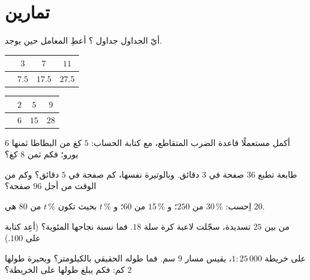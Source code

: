 \section{تمارين}

\begin{exercise}[$\star$]\label{exo:g7:prop:1}
أيّ الجداول جداول ؟ أعطِ المعامل حين
يوجد.
\begin{center}
\renewcommand{\arraystretch}{1.2}
\begin{tabular}{l|ccc}
 & $3$ & $7$ & $11$ \\
\hline
 & $7.5$ & $17.5$ & $27.5$ \\
\end{tabular}
\qquad
\begin{tabular}{l|ccc}
 & $2$ & $5$ & $9$ \\
\hline
 & $6$ & $15$ & $28$ \\
\end{tabular}
\end{center}
\end{exercise}

\begin{exercise}[$\star$]\label{exo:g7:prop:2}
أكمل مستعملًا قاعدة الضرب المتقاطع، مع كتابة الحساب:
$5$ كغ من البطاطا ثمنها $6$ يورو؛ فكم ثمن $8$ كغ؟
\end{exercise}

\begin{exercise}[$\star$]\label{exo:g7:prop:3}
طابعة تطبع $36$ صفحة في $3$ دقائق. وبالوتيرة نفسها، كم
صفحة في $5$ دقائق؟ وكم من الوقت من أجل $96$ صفحة؟
\end{exercise}

\begin{exercise}[$\star$]\label{exo:g7:prop:4}
اِحسب: $30\,\%$ من $250$؛ \quad و $15\,\%$ من $60$؛ \quad و $t\,\%$ بحيث
تكون $t\,\%$ من $80$ هي $20$.
\end{exercise}

\begin{exercise}[$\star$]\label{exo:g7:prop:5}
من بين $25$ تسديدة، سجّلت لاعبة كرة سلة $18$. فما نسبة
نجاحها المئوية؟ (أعِد كتابة  على  $100$.)
\end{exercise}

\begin{exercise}[$\star$]\label{exo:g7:prop:6}
على خريطة $1 : 25\,000$، يقيس مسار $9$ سم. فما طوله
الحقيقي بالكيلومتر؟ وبحيرة طولها $2$ كم: فكم يبلغ طولها على الخريطة؟
\end{exercise}

